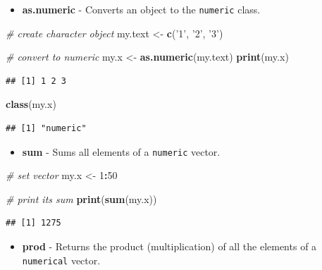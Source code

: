 \documentclass[11pt,]{book}
\newenvironment{Shaded}{\begin{snugshade}}{\end{snugshade}}
\newcommand{\KeywordTok}[1]{\textcolor[rgb]{0.27,0.27,0.27}{\textbf{#1}}}
\newcommand{\DecValTok}[1]{\textcolor[rgb]{0.06,0.06,0.06}{#1}}
\newcommand{\StringTok}[1]{\textcolor[rgb]{0.5,0.5,0.5}{#1}}
\newcommand{\CommentTok}[1]{\textcolor[rgb]{0.56,0.35,0.01}{\textit{#1}}}
\newcommand{\OperatorTok}[1]{\textcolor[rgb]{0.81,0.36,0.00}{\textbf{#1}}}
\newcommand{\NormalTok}[1]{#1}
\providecommand{\tightlist}{%
  \setlength{\itemsep}{0pt}\setlength{\parskip}{0pt}}
\begin{document}
\begin{itemize}
\tightlist
\item
  \textbf{as.numeric} - Converts an object to the \texttt{numeric}
  class. 
\end{itemize}

\begin{Shaded}
\begin{Highlighting}[]
\CommentTok{# create character object}
\NormalTok{my.text <-}\StringTok{ }\KeywordTok{c}\NormalTok{(}\StringTok{'1'}\NormalTok{, }\StringTok{'2'}\NormalTok{, }\StringTok{'3'}\NormalTok{)}

\CommentTok{# convert to numeric}
\NormalTok{my.x <-}\StringTok{ }\KeywordTok{as.numeric}\NormalTok{(my.text)}
\KeywordTok{print}\NormalTok{(my.x)}
\end{Highlighting}
\end{Shaded}

\begin{verbatim}
## [1] 1 2 3
\end{verbatim}

\begin{Shaded}
\begin{Highlighting}[]
\KeywordTok{class}\NormalTok{(my.x)}
\end{Highlighting}
\end{Shaded}

\begin{verbatim}
## [1] "numeric"
\end{verbatim}

\begin{itemize}
\tightlist
\item
  \textbf{sum} - Sums all elements of a \texttt{numeric} vector.
\end{itemize}

\begin{Shaded}
\begin{Highlighting}[]
\CommentTok{# set vector}
\NormalTok{my.x <-}\StringTok{ }\DecValTok{1}\OperatorTok{:}\DecValTok{50}

\CommentTok{# print its sum}
\KeywordTok{print}\NormalTok{(}\KeywordTok{sum}\NormalTok{(my.x))}
\end{Highlighting}
\end{Shaded}

\begin{verbatim}
## [1] 1275
\end{verbatim}

\begin{itemize}
\tightlist
\item
  \textbf{prod} - Returns the product (multiplication) of all the
  elements of a \texttt{numerical} vector. 
\end{itemize}
\end{document}
